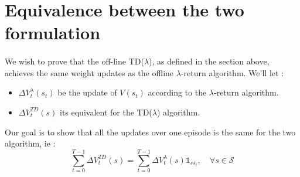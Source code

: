 \documentclass[a4paper]{article}
\newcommand\mS{\mathcal{S}}
\newcommand\tdl{TD($\lambda$)}
\begin{document}
	\section{Equivalence between the two formulation}
	{
		\paragraph{} We wish to prove that the off-line \tdl, as defined in the section above, achieves the same weight updates as the offline $\lambda$-return algorithm. We'll let : 
		\begin{itemize}
			\item $\Delta V_t^{\lambda}(s_t)$ be the update of $V(s_t)$ according to the $\lambda$-return algorithm. 
			\item $\Delta V_t^{TD}(s)$ its equivalent for the \tdl{} algorithm. 
		\end{itemize}
		Our goal is to show that all the updates over one episode is the same for the two algorithm, ie : 
		\begin{equation}
			\sum_{t=0}^{T-1}\Delta V_t^{TD}(s) = \sum_{t=0}^{T-1} \Delta V_t^\lambda(s)\mathds{1}_{ss_t}, \quad \forall s \in\mS
			\label{eq::equi}
		\end{equation}
		
}
\end{document}
